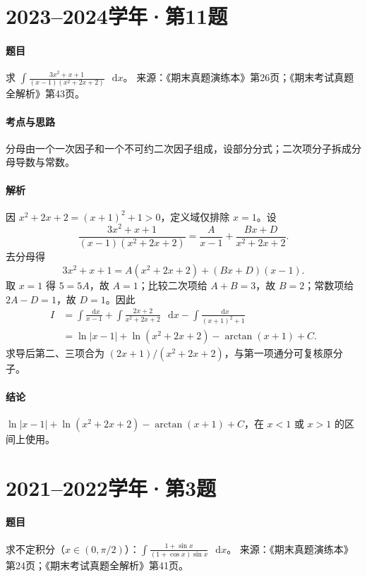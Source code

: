 \documentclass[UTF8,fontset=fandol,12pt,oneside,openany]{ctexrep}
\newcommand{\dd}{\mathop{}\!\mathrm d}
\theoremstyle{definition}
\begin{document}
\par\addvspace{18pt}\noindent\begin{minipage}{\linewidth}
\section{2023--2024学年·第11题}
\paragraph{题目}求 $\displaystyle\int\frac{3x^2+x+1}{(x-1)(x^2+2x+2)}\,\dd x$。
来源：《期末真题演练本》第26页；《期末考试真题全解析》第43页。
\end{minipage}\par
\paragraph{考点与思路}分母由一个一次因子和一个不可约二次因子组成，设部分分式；二次项分子拆成分母导数与常数。
\paragraph{解析}因 $x^2+2x+2=(x+1)^2+1>0$，定义域仅排除 $x=1$。设
\[
\frac{3x^2+x+1}{(x-1)(x^2+2x+2)}
=\frac A{x-1}+\frac{Bx+D}{x^2+2x+2}.
\]
去分母得
\[
3x^2+x+1=A(x^2+2x+2)+(Bx+D)(x-1).
\]
取 $x=1$ 得 $5=5A$，故 $A=1$；比较二次项给 $A+B=3$，故 $B=2$；常数项给 $2A-D=1$，故 $D=1$。因此
\begin{align*}
I&=\int\frac{\dd x}{x-1}
+\int\frac{2x+2}{x^2+2x+2}\,\dd x
-\int\frac{\dd x}{(x+1)^2+1}\\
&=\ln|x-1|+\ln(x^2+2x+2)-\arctan(x+1)+C.
\end{align*}
求导后第二、三项合为 $(2x+1)/(x^2+2x+2)$，与第一项通分可复核原分子。
\paragraph{结论}$\boxed{\ln|x-1|+\ln(x^2+2x+2)-\arctan(x+1)+C}$，在 $x<1$ 或 $x>1$ 的区间上使用。

\par\addvspace{18pt}\noindent\begin{minipage}{\linewidth}
\section{2021--2022学年·第3题}
\paragraph{题目}求不定积分（$x\in(0,\pi/2)$）：$\displaystyle\int\frac{1+\sin x}{(1+\cos x)\sin x}\,\dd x$。
来源：《期末真题演练本》第24页；《期末考试真题全解析》第41页。
\end{minipage}\par
\end{document}
